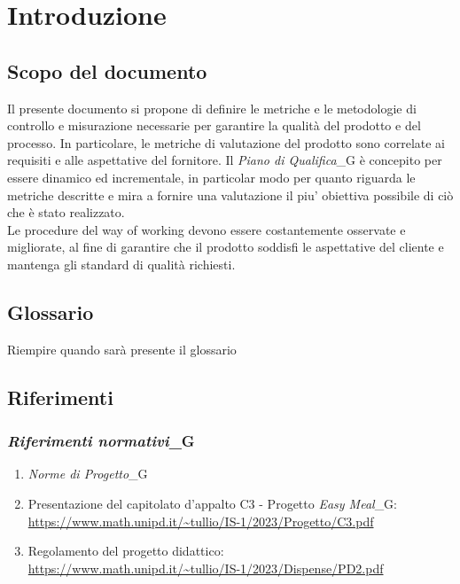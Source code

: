 \section{Introduzione}
\subsection{Scopo del documento}
Il presente documento si propone di definire le metriche e le metodologie di controllo e misurazione necessarie per garantire la qualità del prodotto e del processo. In particolare, le metriche di valutazione del prodotto sono correlate ai requisiti e alle aspettative del fornitore.
Il \textit{Piano di Qualifica}_G è concepito per essere dinamico ed incrementale, in particolar modo per quanto riguarda le metriche descritte e mira a fornire una valutazione il piu' obiettiva possibile di ciò che è stato realizzato.\\
Le procedure del way of working devono essere costantemente osservate e migliorate, al fine di garantire che il prodotto soddisfi le aspettative del cliente e mantenga gli standard di qualità richiesti.
\subsection{Glossario}
Riempire quando sarà presente il glossario
\subsection{Riferimenti}
\subsubsection{\textit{Riferimenti normativi}_G}
\begin{enumerate}
    \item \textit{Norme di Progetto}_G
    \item Presentazione del capitolato d'appalto C3 - Progetto \textit{Easy Meal}_G: \\ 
    \url{https://www.math.unipd.it/~tullio/IS-1/2023/Progetto/C3.pdf}
    \item Regolamento del progetto didattico: \\ 
    \url{https://www.math.unipd.it/~tullio/IS-1/2023/Dispense/PD2.pdf}
\end{enumerate}
